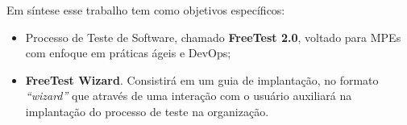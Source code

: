 Em síntese esse trabalho tem como objetivos específicos:

\begin{itemize}
    \item Processo de Teste de Software, chamado \textbf{FreeTest 2.0}, voltado para MPEs com enfoque em práticas ágeis e DevOps;
    \item \textbf{FreeTest Wizard}. Consistirá em um guia de implantação, no formato \textit{“wizard”} que através de uma interação com o usuário auxiliará na implantação do processo de teste na organização. 
\end{itemize}




